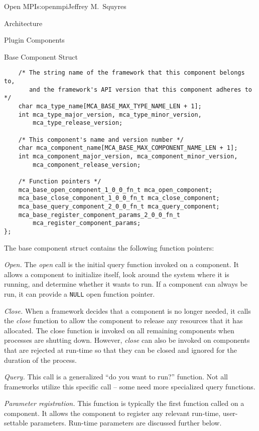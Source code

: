 \begin{aosachapter}{Open MPI}{s:openmpi}{Jeffrey M.\ Squyres}
\begin{aosasect1}{Architecture}
\begin{aosasect2}{Plugin Components}
\begin{aosabox}{Base Component Struct}
\begin{verbatim}
    /* The string name of the framework that this component belongs to,
       and the framework's API version that this component adheres to */
    char mca_type_name[MCA_BASE_MAX_TYPE_NAME_LEN + 1];
    int mca_type_major_version, mca_type_minor_version,  
        mca_type_release_version;

    /* This component's name and version number */
    char mca_component_name[MCA_BASE_MAX_COMPONENT_NAME_LEN + 1];
    int mca_component_major_version, mca_component_minor_version,
        mca_component_release_version;

    /* Function pointers */  
    mca_base_open_component_1_0_0_fn_t mca_open_component;
    mca_base_close_component_1_0_0_fn_t mca_close_component;
    mca_base_query_component_2_0_0_fn_t mca_query_component;
    mca_base_register_component_params_2_0_0_fn_t 
        mca_register_component_params;
};
\end{verbatim}
\end{aosabox}

The base component struct contains the following function pointers:

\begin{aosaitemize}
\item {\em Open.} The {\em open} call is the initial query function
  invoked on a component.  It allows a component to initialize itself,
  look around the system where it is running, and determine whether it
  wants to run.  If a component can always be run, it can provide a
  {\tt NULL} open function pointer.

\item {\em Close.} When a framework decides that a component is no
  longer needed, it calls the {\em close} function to allow the
  component to release any resources that it has allocated.  The close
  function is invoked on all remaining components when processes are
  shutting down.  However, {\em close} can also be invoked on
  components that are rejected at run-time so that they can be closed
  and ignored for the duration of the process.

\item {\em Query.} This call is a generalized ``do you want to run?''
  function.  Not all frameworks utilize this specific call -- some
  need more specialized query functions.

\item {\em Parameter registration.} This function is typically the
  first function called on a component.  It allows the component to
  register any relevant run-time, user-settable parameters.  Run-time
  parameters are discussed further below.
\end{aosaitemize}


\end{aosasect2}
\end{aosasect1}
\end{aosachapter}

